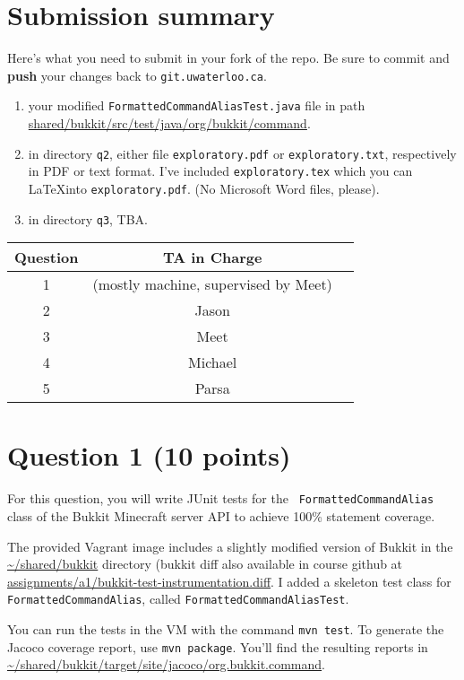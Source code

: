 \documentclass[10pt,hidelinks]{article}
\begin{document}
\section*{Submission summary}
Here's what you need to submit in your fork of the repo. Be sure to commit
and {\bf push} your changes back to {\tt git.uwaterloo.ca}.
\begin{enumerate}
\item your modified {\tt FormattedCommandAliasTest.java} file in path
\url{shared/bukkit/src/test/java/org/bukkit/command}.
\item in directory {\tt q2}, either file {\tt exploratory.pdf} or {\tt exploratory.txt}, respectively
in PDF or text format. I've included {\tt exploratory.tex} which you can
\LaTeX into {\tt exploratory.pdf}. (No Microsoft Word files, please).
\item in directory {\tt q3}, TBA.
\end{enumerate}
 
 \begin{center}
 \begin{tabular}{c|cc}
 Question   &  TA in Charge \\ \hline
1 & (mostly machine, supervised by Meet) \\ 
2 & Jason \\ 
3 & Meet \\ 
4 & Michael \\
5 & Parsa
 \end{tabular}
 \end{center}

\newpage

\section*{Question 1 (10 points)}
For this question, you will write JUnit tests for the {\tt
  FormattedCommandAlias} class of the Bukkit Minecraft server API to
achieve 100\% statement coverage.

The provided Vagrant image includes a slightly modified version of
Bukkit in the \url{~/shared/bukkit} directory (bukkit diff also available in course
github at \url{assignments/a1/bukkit-test-instrumentation.diff}.  
I added a skeleton test class for {\tt
  FormattedCommandAlias}, called {\tt FormattedCommandAliasTest}.

You can run the tests in the VM with the command {\tt mvn test}.  To
generate the Jacoco coverage report, use {\tt mvn package}. You'll
find the resulting reports in
\url{~/shared/bukkit/target/site/jacoco/org.bukkit.command}.
\end{document}
